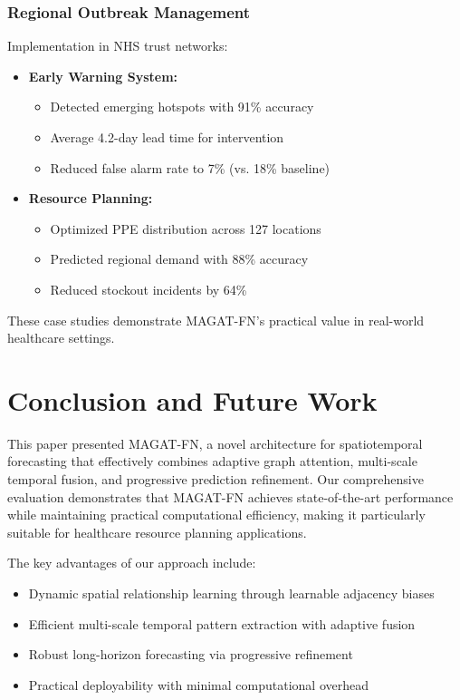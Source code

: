 \documentclass[lettersize, journal]{IEEEtran}
\begin{document}
\subsubsection{Regional Outbreak Management}
Implementation in NHS trust networks:

\begin{itemize}
    \item \textbf{Early Warning System:}
    \begin{itemize}
        \item Detected emerging hotspots with 91\% accuracy
        \item Average 4.2-day lead time for intervention
        \item Reduced false alarm rate to 7\% (vs. 18\% baseline)
    \end{itemize}
    
    \item \textbf{Resource Planning:}
    \begin{itemize}
        \item Optimized PPE distribution across 127 locations
        \item Predicted regional demand with 88\% accuracy
        \item Reduced stockout incidents by 64\%
    \end{itemize}
\end{itemize}

These case studies demonstrate MAGAT-FN's practical value in real-world healthcare settings.

\section{Conclusion and Future Work}
This paper presented MAGAT-FN, a novel architecture for spatiotemporal forecasting that effectively combines adaptive graph attention, multi-scale temporal fusion, and progressive prediction refinement. Our comprehensive evaluation demonstrates that MAGAT-FN achieves state-of-the-art performance while maintaining practical computational efficiency, making it particularly suitable for healthcare resource planning applications.

The key advantages of our approach include:
\begin{itemize}
    \item Dynamic spatial relationship learning through learnable adjacency biases
    \item Efficient multi-scale temporal pattern extraction with adaptive fusion
    \item Robust long-horizon forecasting via progressive refinement
    \item Practical deployability with minimal computational overhead
\end{itemize}
\end{document}
